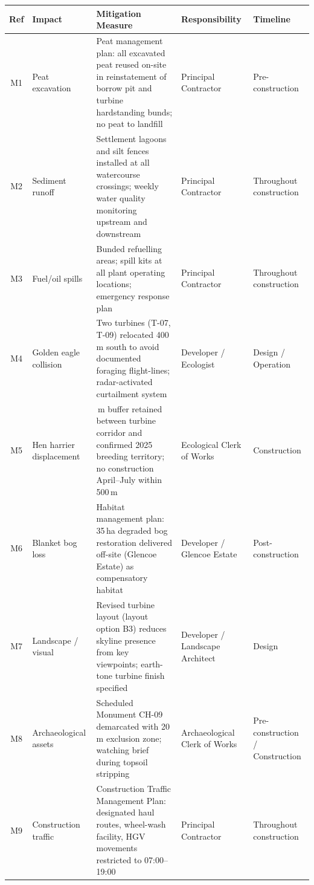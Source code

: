 \begin{tabularx}{\linewidth}{@{}c >{\raggedright\arraybackslash}p{2.4cm} >{\raggedright\arraybackslash}X >{\raggedright\arraybackslash}p{2.2cm} >{\raggedright\arraybackslash}p{2cm} @{}}
\toprule
\rowcolor{accent}
\color{white}\bfseries Ref & \color{white}\bfseries Impact & \color{white}\bfseries Mitigation Measure & \color{white}\bfseries Responsibility & \color{white}\bfseries Timeline \\
\midrule
\rowcolor{rowshade}
M1 & Peat excavation & Peat management plan: all excavated peat reused on-site in reinstatement of borrow pit and turbine hardstanding bunds; no peat to landfill & Principal Contractor & Pre-construction \\
M2 & Sediment runoff & Settlement lagoons and silt fences installed at all watercourse crossings; weekly water quality monitoring upstream and downstream & Principal Contractor & Throughout construction \\
\rowcolor{rowshade}
M3 & Fuel/oil spills & Bunded refuelling areas; spill kits at all plant operating locations; emergency response plan & Principal Contractor & Throughout construction \\
M4 & Golden eagle collision & Two turbines (T-07, T-09) relocated 400\,m south to avoid documented foraging flight-lines; radar-activated curtailment system & Developer / Ecologist & Design / Operation \\
\rowcolor{rowshade}
M5 & Hen harrier displacement & 200\,m buffer retained between turbine corridor and confirmed 2025 breeding territory; no construction April--July within 500\,m & Ecological Clerk of Works & Construction \\
M6 & Blanket bog loss & Habitat management plan: 35\,ha degraded bog restoration delivered off-site (Glencoe Estate) as compensatory habitat & Developer / Glencoe Estate & Post-construction \\
\rowcolor{rowshade}
M7 & Landscape / visual & Revised turbine layout (layout option B3) reduces skyline presence from key viewpoints; earth-tone turbine finish specified & Developer / Landscape Architect & Design \\
M8 & Archaeological assets & Scheduled Monument CH-09 demarcated with 20\,m exclusion zone; watching brief during topsoil stripping & Archaeological Clerk of Works & Pre-construction / Construction \\
\rowcolor{rowshade}
M9 & Construction traffic & Construction Traffic Management Plan: designated haul routes, wheel-wash facility, HGV movements restricted to 07:00--19:00 & Principal Contractor & Throughout construction \\

\end{tabularx}
